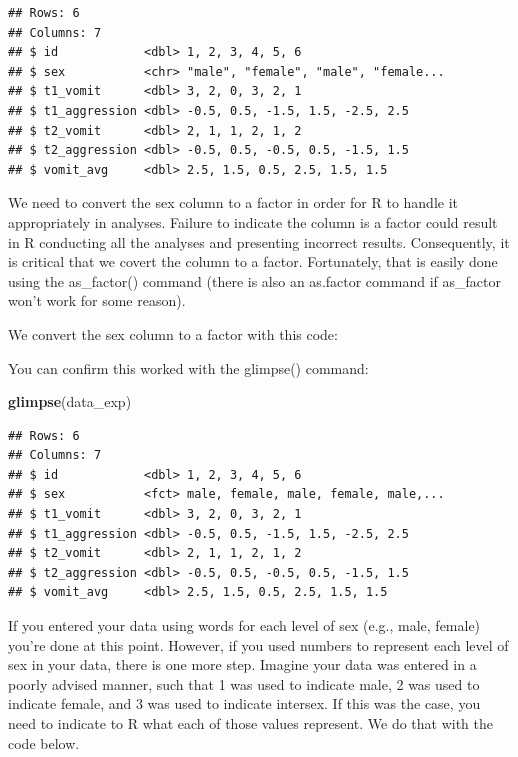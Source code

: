 \documentclass[
]{krantz}
\makeatletter
\newenvironment{Shaded}{\begin{snugshade}}{\end{snugshade}}
\newcommand{\DataTypeTok}[1]{\textcolor[rgb]{0.27,0.27,0.27}{#1}}
\newcommand{\KeywordTok}[1]{\textcolor[rgb]{0.27,0.27,0.27}{\textbf{#1}}}
\newcommand{\NormalTok}[1]{#1}
\newcommand{\OperatorTok}[1]{\textcolor[rgb]{0.43,0.43,0.43}{\textbf{#1}}}
\newcommand{\StringTok}[1]{\textcolor[rgb]{0.5,0.5,0.5}{#1}}
\newenvironment{kframe}{%
\medskip{}
\setlength{\fboxsep}{.8em}
 \def\at@end@of@kframe{}%
 \ifinner\ifhmode%
  \def\at@end@of@kframe{\end{minipage}}%
  \begin{minipage}{\columnwidth}%
 \fi\fi%
 \def\FrameCommand##1{\hskip\@totalleftmargin \hskip-\fboxsep
 \colorbox{shadecolor}{##1}\hskip-\fboxsep
     \hskip-\linewidth \hskip-\@totalleftmargin \hskip\columnwidth}%
 \MakeFramed {\advance\hsize-\width
   \@totalleftmargin\z@ \linewidth\hsize
   \@setminipage}}%
 {\par\unskip\endMakeFramed%
 \at@end@of@kframe}
\renewenvironment{Shaded}{\begin{kframe}}{\end{kframe}}
\makeatother
\begin{document}
\begin{verbatim}
## Rows: 6
## Columns: 7
## $ id            <dbl> 1, 2, 3, 4, 5, 6
## $ sex           <chr> "male", "female", "male", "female...
## $ t1_vomit      <dbl> 3, 2, 0, 3, 2, 1
## $ t1_aggression <dbl> -0.5, 0.5, -1.5, 1.5, -2.5, 2.5
## $ t2_vomit      <dbl> 2, 1, 1, 2, 1, 2
## $ t2_aggression <dbl> -0.5, 0.5, -0.5, 0.5, -1.5, 1.5
## $ vomit_avg     <dbl> 2.5, 1.5, 0.5, 2.5, 1.5, 1.5
\end{verbatim}

We need to convert the sex column to a factor in order for R to handle it appropriately in analyses. Failure to indicate the column is a factor could result in R conducting all the analyses and presenting incorrect results. Consequently, it is critical that we covert the column to a factor. Fortunately, that is easily done using the as\_factor() command (there is also an as.factor command if as\_factor won't work for some reason).

We convert the sex column to a factor with this code:

\begin{Shaded}
\end{Shaded}

You can confirm this worked with the glimpse() command:

\begin{Shaded}
\begin{Highlighting}[]
\KeywordTok{glimpse}\NormalTok{(data_exp)}
\end{Highlighting}
\end{Shaded}

\begin{verbatim}
## Rows: 6
## Columns: 7
## $ id            <dbl> 1, 2, 3, 4, 5, 6
## $ sex           <fct> male, female, male, female, male,...
## $ t1_vomit      <dbl> 3, 2, 0, 3, 2, 1
## $ t1_aggression <dbl> -0.5, 0.5, -1.5, 1.5, -2.5, 2.5
## $ t2_vomit      <dbl> 2, 1, 1, 2, 1, 2
## $ t2_aggression <dbl> -0.5, 0.5, -0.5, 0.5, -1.5, 1.5
## $ vomit_avg     <dbl> 2.5, 1.5, 0.5, 2.5, 1.5, 1.5
\end{verbatim}

If you entered your data using words for each level of sex (e.g., male, female) you're done at this point. However, if you used numbers to represent each level of sex in your data, there is one more step. Imagine your data was entered in a poorly advised manner, such that 1 was used to indicate male, 2 was used to indicate female, and 3 was used to indicate intersex. If this was the case, you need to indicate to R what each of those values represent. We do that with the code below.
\end{document}
